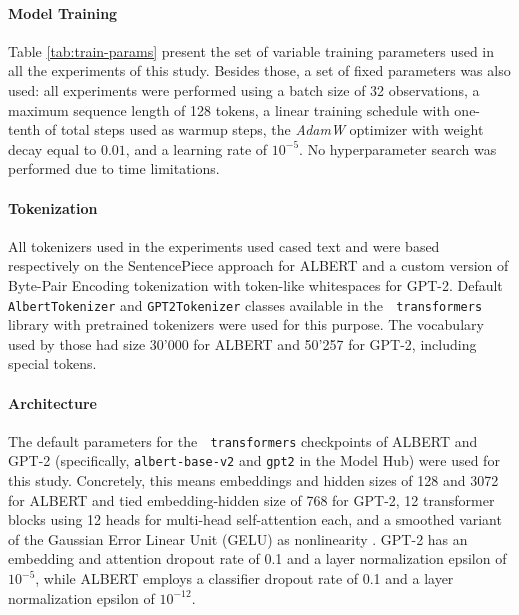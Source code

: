 \documentclass[a4paper, nobind]{templates/ociamthesis}
\begin{document}
\paragraph{Model Training} Table \ref{tab:train-params} present the set of variable training parameters used in all the experiments of this study. Besides those, a set of fixed parameters was also used: all experiments were performed using a batch size of 32 observations, a maximum sequence length of 128 tokens, a linear training schedule with one-tenth of total steps used as warmup steps, the \emph{AdamW} optimizer \autocite{loshchilov-hutter-2019-decoupled} with weight decay equal to \(0.01\), and a learning rate of \(10^{-5}\). No hyperparameter search was performed due to time limitations.

\paragraph{Tokenization} All tokenizers used in the experiments used cased text and were based respectively on the SentencePiece approach \autocite{kudo-richardson-2018-sentencepiece} for ALBERT and a custom version of Byte-Pair Encoding tokenization \autocite{sennrich-etal-2016-neural} with token-like whitespaces for GPT-2. Default \texttt{AlbertTokenizer} and \texttt{GPT2Tokenizer} classes available in the 🤗 \texttt{transformers} library with pretrained tokenizers were used for this purpose. The vocabulary used by those had size 30'000 for ALBERT and 50'257 for GPT-2, including special tokens.

\paragraph{Architecture} The default parameters for the 🤗 \texttt{transformers} checkpoints of ALBERT and GPT-2 (specifically, \texttt{albert-base-v2} and \texttt{gpt2} in the Model Hub) were used for this study. Concretely, this means embeddings and hidden sizes of 128 and 3072 for ALBERT and tied embedding-hidden size of 768 for GPT-2, 12 transformer blocks using 12 heads for multi-head self-attention each, and a smoothed variant of the Gaussian Error Linear Unit (GELU) as nonlinearity \autocite{hendrycks-gimpel-2016-gaussian}. GPT-2 has an embedding and attention dropout rate of 0.1 and a layer normalization \autocite{ba-etal-2016-layer} epsilon of \(10^{-5}\), while ALBERT employs a classifier dropout rate of 0.1 and a layer normalization epsilon of \(10^{-12}\).
\end{document}
